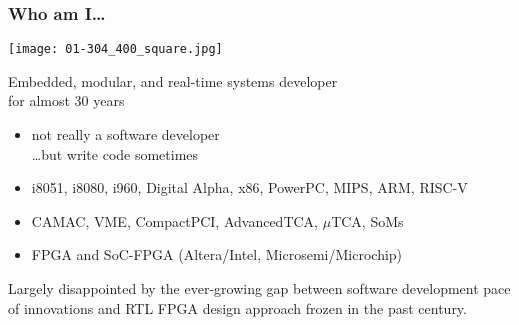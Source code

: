 \begin{frame}
  \frametitle{Who am I\dots}

  \vspace{.7cm}

  \begin{flushleft}
    \texttt{[image: 01-304\_400\_square.jpg]}
  \end{flushleft}

  \vspace{-5.5cm}

  Embedded, modular, and real-time systems developer\\for almost 30 years


  \begin{flushright}
    \begin{minipage}{7cm}

      \begin{itemize}
      \item not really a software developer\\
        \dots but write code sometimes
      \item i8051, i8080, i960, Digital Alpha, x86, PowerPC, MIPS, ARM, RISC-V
      \item CAMAC, VME, CompactPCI, AdvancedTCA, $\mu$TCA, SoMs
      \item FPGA and SoC-FPGA (Altera/Intel, Microsemi/Microchip)
      \end{itemize}
    \end{minipage}
  \end{flushright}

  Largely disappointed by the ever-growing gap between software
  development pace of innovations and RTL FPGA design approach
  frozen in the past century.


\end{frame}
